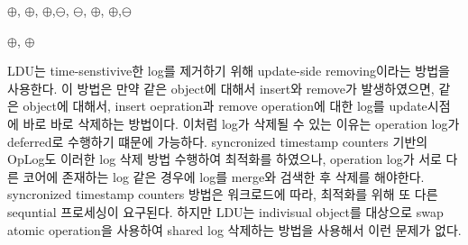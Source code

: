 






\begin{center}
$\oplus$, $\oplus$, $\oplus$,$\ominus$,
$\ominus$, $\oplus$, $\oplus$,$\ominus$
\end{center}









\begin{center}
 $\oplus$, $\oplus$
\end{center}



\fi


\ifkor
LDU는 time-senstivive한 log를 제거하기 위해 update-side removing이라는 방법을 사용한다.
이 방법은 만약 같은 object에 대해서 insert와 remove가 발생하였으면, 같은 object에
대해서, insert oepration과 remove operation에 대한 log를 update시점에 바로 바로 삭제하는 방법이다. 
이처럼 log가 삭제될 수 있는 이유는 operation log가 deferred로 수행하기 떄문에 가능하다. 
syncronized timestamp counters 기반의 OpLog도 이러한 log 삭제 방법 수행하여 최적화를 하였으나,
operation log가 서로 다른 코어에 존재하는 log 같은 경우에 log를 merge와 검색한 후 삭제를 해야한다. 
syncronized timestamp counters 방법은 워크로드에 따라, 최적화를 위해 또 다른 sequntial 프로세싱이
요구된다.
하지만 LDU는 indivisual object를 대상으로 swap atomic operation을 사용하여
shared log 삭제하는 방법을 사용해서 이런 문제가 없다.
\else



